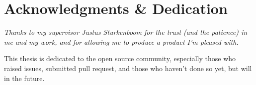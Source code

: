 
\begingroup
  \let\clearpage\relax
  \let\cleardoublepage\relax
  \chapter*{Acknowledgments \& Dedication}

  \itshape
  Thanks to my supervisor Justus Sturkenboom for the trust (and the patience) in me and my work, and for allowing me to produce a product I'm pleased with.

  \medskip
  \noindent
  This thesis is dedicated to the open source community, especially those who raised issues, submitted pull request, and those who haven't done so yet, but will in the future.
\endgroup
